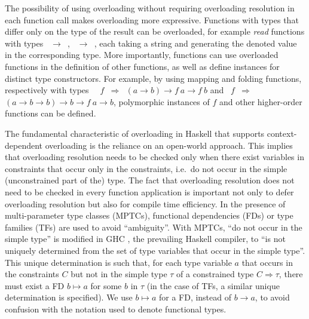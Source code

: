 The possibility of using overloading without requiring overloading
resolution in each function call makes overloading more
expressive. Functions with types that differ only on the type of the
result can be overloaded, for example {\em read\/} functions with
types {\tt \String\ $\rightarrow$ \Bool}, {\tt \String\ $\rightarrow$
  \Int}, each taking a string and generating the denoted value in the
corresponding type.  More importantly, functions can use overloaded
functions in the definition of other functions, as well as define
instances for distinct type constructors. For example, by using
mapping and folding functions, respectively with types {\tt
  \Functor\ $f$ $\Rightarrow$ $(a\rightarrow b)\rightarrow
  f\:a\rightarrow f\:b$} and {\tt \Foldable\ $f$ $\Rightarrow$
  $(a\rightarrow b\rightarrow b)\rightarrow b\rightarrow
  f\:a\rightarrow b$}, polymorphic instances of $f$ and other
higher-order functions can be defined.


The fundamental characteristic of overloading in Haskell that supports
context-dependent overloading is the reliance on an open-world
approach.
This implies that overloading resolution needs to be checked only when
there exist variables in constraints that occur only in the
constraints, i.e.~do not occur in the simple (unconstrained part of
the) type. The fact that overloading resolution does not need to be
checked in every function application is important not only to defer
overloading resolution but also for compile time efficiency.  In the
presence of multi-parameter type classes (MPTCs), functional
dependencies (FDs) \cite{Type-classes-with-FDs-MarkJones00,Jones:2008}
or type families (TFs) \cite{Chakravarty2005,Schrijvers:2008} are used
to avoid ``ambiguity''.  With MPTCs, ``do not occur in the simple
type'' is modified in GHC \cite{GHC}, the prevailing Haskell compiler,
to ``is not uniquely determined from the set of type variables that
occur in the simple type''. This unique determination is such that,
for each type variable $a$ that occurs in the constraints $C$ but not
in the simple type $\tau$ of a constrained type $C\Rightarrow \tau$,
there must exist a FD $b \mapsto a$ for some $b$ in $\tau$ (in the
case of TFs, a similar unique determination is specified). We use $b
\mapsto a$ for a FD, instead of $b \rightarrow a$, to avoid confusion
with the notation used to denote functional types.

